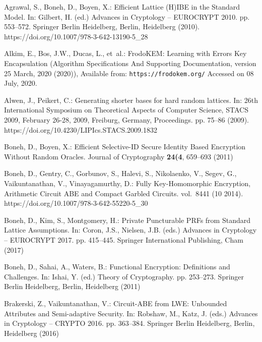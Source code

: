 \documentclass[runningheads,10pt]{llncs}
\begin{document}
%
%
%
\begin{thebibliography}{10}
	\providecommand{\url}[1]{\texttt{#1}}
	\providecommand{\urlprefix}{URL }
	\providecommand{\doi}[1]{https://doi.org/#1}
	
	Agrawal, S., Boneh, D., Boyen, X.: {Efficient Lattice (H)IBE in the Standard
		Model}. In: Gilbert, H. (ed.) Advances in Cryptology -- EUROCRYPT 2010. pp.
	553--572. Springer Berlin Heidelberg, Berlin, Heidelberg (2010).
	\doi{10.1007/978-3-642-13190-5\_28}
	
	Alkim, E., Bos, J.W., Ducas, L., et~al.: {Frodo{KEM}: {L}earning with {E}rrors
		{K}ey {E}ncapsulation (Algorithm Specifications And Supporting Documentation,
		version 25 March, 2020} (2020)), {A}vailable from:
	\url{https://frodokem.org/} Accessed on 08 July, 2020.
	
	Alwen, J., Peikert, C.: Generating shorter bases for hard random lattices. In:
	26th International Symposium on Theoretical Aspects of Computer Science,
	{STACS} 2009, February 26-28, 2009, Freiburg, Germany, Proceedings. pp.
	75--86 (2009). \doi{10.4230/LIPIcs.STACS.2009.1832}
	
	Boneh, D., Boyen, X.: {Efficient Selective-ID Secure Identity Based Encryption
		Without Random Oracles}. Journal of Cryptography  \textbf{24(4},  659--693
	(2011)
	
	Boneh, D., Gentry, C., Gorbunov, S., Halevi, S., Nikolaenko, V., Segev, G.,
	Vaikuntanathan, V., Vinayagamurthy, D.: {Fully Key-Homomorphic Encryption,
		Arithmetic Circuit ABE and Compact Garbled Circuits}. vol.~8441 (10 2014).
	\doi{10.1007/978-3-642-55220-5\_30}
	
	Boneh, D., Kim, S., Montgomery, H.: {Private Puncturable PRFs from Standard
		Lattice Assumptions}. In: Coron, J.S., Nielsen, J.B. (eds.) Advances in
	Cryptology -- EUROCRYPT 2017. pp. 415--445. Springer International
	Publishing, Cham (2017)
	
	Boneh, D., Sahai, A., Waters, B.: {Functional Encryption: Definitions and
		Challenges}. In: Ishai, Y. (ed.) Theory of Cryptography. pp. 253--273.
	Springer Berlin Heidelberg, Berlin, Heidelberg (2011)
	
	Brakerski, Z., Vaikuntanathan, V.: {{Circuit-ABE from LWE: Unbounded Attributes
			and Semi-adaptive Security}}. In: Robshaw, M., Katz, J. (eds.) Advances in
	Cryptology -- CRYPTO 2016. pp. 363--384. Springer Berlin Heidelberg, Berlin,
	Heidelberg (2016)
	

\end{thebibliography}
\end{document}
